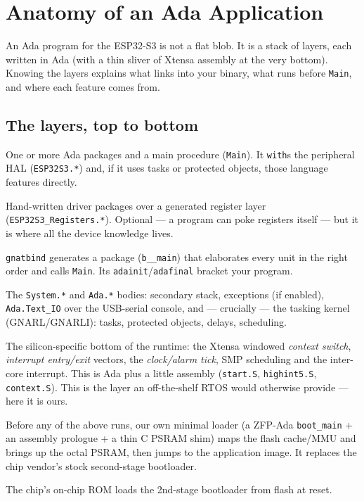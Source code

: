 \chapter{Anatomy of an Ada Application}
\label{ch:anatomy}

An Ada program for the ESP32-S3 is not a flat blob. It is a stack of layers, each
written in Ada (with a thin sliver of Xtensa assembly at the very bottom). Knowing
the layers explains what links into your binary, what runs before \texttt{Main},
and where each feature comes from.

\section{The layers, top to bottom}

\begin{description}[style=nextline]
\item[Your application.] One or more Ada packages and a main procedure
  (\texttt{Main}). It \texttt{with}s the peripheral HAL (\texttt{ESP32S3.*}) and,
  if it uses tasks or protected objects, those language features directly.
\item[The HAL (\texttt{libs/esp32s3\_hal}).] Hand-written driver packages over a
  generated register layer (\texttt{ESP32S3\_Registers.*}). Optional --- a program
  can poke registers itself --- but it is where all the device knowledge lives.
\item[The GNAT binder output.] \texttt{gnatbind} generates a package
  (\texttt{b\_\_main}) that elaborates every unit in the right order and calls
  \texttt{Main}. Its \texttt{adainit}/\texttt{adafinal} bracket your program.
\item[The Ada runtime (RTS).] The \texttt{System.*} and \texttt{Ada.*} bodies:
  secondary stack, exceptions (if enabled), \texttt{Ada.Text\_IO} over the
  USB-serial console, and --- crucially --- the tasking kernel (GNARL/GNARLI):
  tasks, protected objects, delays, scheduling.
\item[Board support.] The silicon-specific bottom of the runtime: the Xtensa
  windowed \emph{context switch}, \emph{interrupt entry/exit} vectors, the
  \emph{clock/alarm tick}, SMP scheduling and the inter-core interrupt. This is
  Ada plus a little assembly (\texttt{start.S}, \texttt{highint5.S},
  \texttt{context.S}). This is the layer an off-the-shelf RTOS would otherwise
  provide --- here it is ours.
\item[The 2nd-stage bootloader.] Before any of the above runs, our own minimal
  loader (a ZFP-Ada \texttt{boot\_main} + an assembly prologue + a thin C PSRAM
  shim) maps the flash cache/MMU and brings up the octal PSRAM, then jumps to the
  application image. It replaces the chip vendor's stock second-stage bootloader.
\item[The mask ROM.] The chip's on-chip ROM loads the 2nd-stage bootloader from
  flash at reset.
\end{description}

